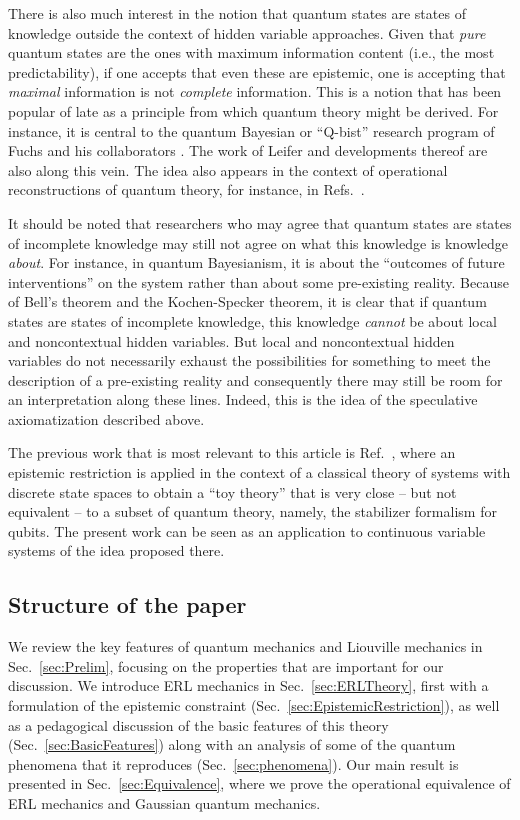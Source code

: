 \documentclass[pra,superscriptaddress,nofootinbib,12pt]{revtex4-2}
\begin{document}
There is also much interest in the notion that quantum states are states of
knowledge outside the context of hidden variable approaches. Given that
\emph{pure} quantum states are the ones with maximum information content
(i.e., the most predictability), if one accepts that even these are
epistemic, one is accepting that \emph{maximal} information is not \emph{complete} information.  This is a notion that has been popular of late as a principle from which quantum theory might be
derived.  For instance, it is central to the quantum Bayesian or ``Q-bist'' research program of Fuchs and his collaborators \cite{CF96, CFS02b, Fuc02, Fuchssamizdat,FuchsQBism}.
The work of Leifer and developments thereof \cite{Lei06,SpeLei11} are also along this vein.
The idea also appears in the context of operational reconstructions of quantum theory,
for instance, in Refs.~\cite{Zei99,BZ99, PDB08}.

It should be noted that researchers who may agree
that quantum states are states of incomplete knowledge may still not agree
on what this knowledge is knowledge \emph{about}.  For instance, in quantum
Bayesianism, it is about the ``outcomes of future
interventions'' on the system rather than about some
pre-existing reality.  Because of Bell's theorem and the Kochen-Specker
theorem, it is clear that if quantum states are states of incomplete
knowledge, this knowledge \emph{cannot} be about local and noncontextual
hidden variables.  But local and noncontextual hidden variables do not
necessarily exhaust the possibilities for something to meet the description
of a pre-existing reality and consequently there may still be room for an
interpretation along these lines.  Indeed, this is the idea of the speculative
axiomatization described above.

The previous work that is most relevant to this article is Ref.~\cite{Spe07}, where an epistemic restriction is applied in the context of a classical theory of systems with discrete state spaces to obtain a ``toy theory'' that is very close -- but not equivalent -- to a subset of quantum theory, namely, the stabilizer formalism for qubits. The present work can be seen as an application to continuous variable systems of the idea proposed there.

\subsection{Structure of the paper}

We review the key features of quantum mechanics and Liouville mechanics in Sec.~\ref{sec:Prelim}, focusing on the properties that are important for our discussion.  We introduce ERL mechanics in Sec.~\ref{sec:ERLTheory}, first with a formulation of the epistemic constraint (Sec.~\ref{sec:EpistemicRestriction}), as well as a pedagogical discussion of the basic features of this theory (Sec.~\ref{sec:BasicFeatures}) along with an analysis of some of the quantum phenomena that it reproduces (Sec.~\ref{sec:phenomena}).  Our main result is presented in Sec.~\ref{sec:Equivalence}, where we prove the operational equivalence of ERL mechanics and Gaussian quantum mechanics.
\end{document}
